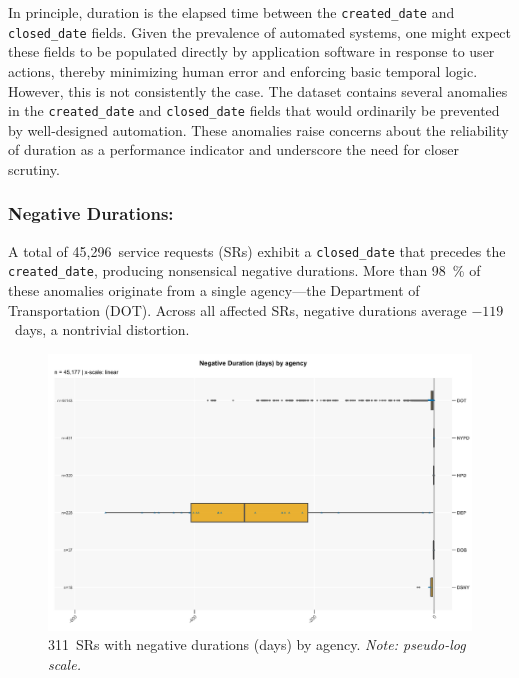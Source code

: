 \documentclass[linenumber]{jdsart}
\begin{document}
In principle, duration is the elapsed time between the 
\texttt{created\_date} and \texttt{closed\_date} fields. 
Given the prevalence of automated systems, one might expect these fields 
to be populated directly by application software in response to user actions, 
thereby minimizing human error and enforcing basic temporal logic. 
However, this is not consistently the case. 
The dataset contains several anomalies in the 
\texttt{created\_date} and \texttt{closed\_date} fields that would 
ordinarily be prevented by well-designed automation. 
These anomalies raise concerns about the reliability of duration as a 
performance indicator and underscore the need for closer scrutiny.

\subsubsection{Negative Durations:}
\label{subsubsec:negativedurations}
A total of 45{,}296~service requests (\textsc{SR}s) exhibit a 
\texttt{closed\_date} that precedes the \texttt{created\_date}, 
producing nonsensical negative durations. 
More than \SI{98}{\percent} of these anomalies originate from a single 
agency—the Department of Transportation (\textsc{DOT}). 
Across all affected \textsc{SR}s, negative durations average $-119$~days, 
a nontrivial distortion.  

\begin{figure}[tbp]
    \centering
    \includegraphics[width=\textwidth, height=0.33\textheight, keepaspectratio]{boxplot_negative_days_by_agency.pdf}
    \caption{311~SRs with negative durations (days) by agency. 
    \textit{Note: pseudo-log scale.}}
    \label{fig:negativedurations}
\end{figure}
\end{document}
